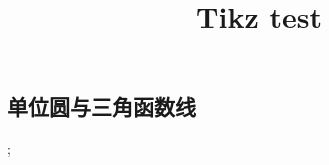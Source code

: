 \documentclass[UTF8]{ctexart}
\title{Tikz test}
\author{}
\begin{document}
\ttfamily

\setlength\parskip{0.3cm}

\maketitle


\subsection{单位圆与三角函数线}
;
\end{document}
